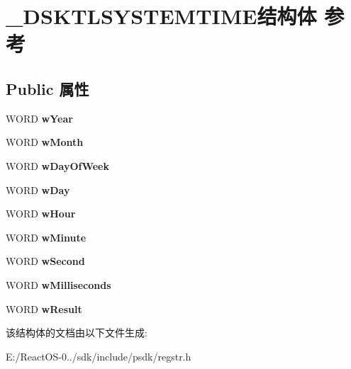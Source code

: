 \hypertarget{struct___d_s_k_t_l_s_y_s_t_e_m_t_i_m_e}{}\section{\+\_\+\+D\+S\+K\+T\+L\+S\+Y\+S\+T\+E\+M\+T\+I\+M\+E结构体 参考}
\label{struct___d_s_k_t_l_s_y_s_t_e_m_t_i_m_e}
\subsection*{Public 属性}
\begin{DoxyCompactItemize}
\item 
\mbox{\label{struct___d_s_k_t_l_s_y_s_t_e_m_t_i_m_e_abef77eef2d9d77eb0e3dff662b320c5e}} 
W\+O\+RD {\bfseries w\+Year}
\item 
\mbox{\label{struct___d_s_k_t_l_s_y_s_t_e_m_t_i_m_e_a383a134afbb8b89af8edbe12421cb6fc}} 
W\+O\+RD {\bfseries w\+Month}
\item 
\mbox{\label{struct___d_s_k_t_l_s_y_s_t_e_m_t_i_m_e_aed573e2c952cf67190c312ebeba8cb8d}} 
W\+O\+RD {\bfseries w\+Day\+Of\+Week}
\item 
\mbox{\label{struct___d_s_k_t_l_s_y_s_t_e_m_t_i_m_e_aaeddb9d8d86417cc228f5a5251b81fc5}} 
W\+O\+RD {\bfseries w\+Day}
\item 
\mbox{\label{struct___d_s_k_t_l_s_y_s_t_e_m_t_i_m_e_aa5d8c7e4dd1c3f3e1db684e605f6c684}} 
W\+O\+RD {\bfseries w\+Hour}
\item 
\mbox{\label{struct___d_s_k_t_l_s_y_s_t_e_m_t_i_m_e_a4d4ea3d34b76dc0d406fa2474776f6fc}} 
W\+O\+RD {\bfseries w\+Minute}
\item 
\mbox{\label{struct___d_s_k_t_l_s_y_s_t_e_m_t_i_m_e_a2c63d9fe5263771949d0b9b2430eff21}} 
W\+O\+RD {\bfseries w\+Second}
\item 
\mbox{\label{struct___d_s_k_t_l_s_y_s_t_e_m_t_i_m_e_a29b758c8b19b0356411d5ba672aaa063}} 
W\+O\+RD {\bfseries w\+Milliseconds}
\item 
\mbox{\label{struct___d_s_k_t_l_s_y_s_t_e_m_t_i_m_e_a5c125256eb8ed8cbb8489ddf24772a13}} 
W\+O\+RD {\bfseries w\+Result}
\end{DoxyCompactItemize}


该结构体的文档由以下文件生成\+:\begin{DoxyCompactItemize}
\item 
E\+:/\+React\+O\+S-\/0../sdk/include/psdk/regstr.\+h\end{DoxyCompactItemize}
